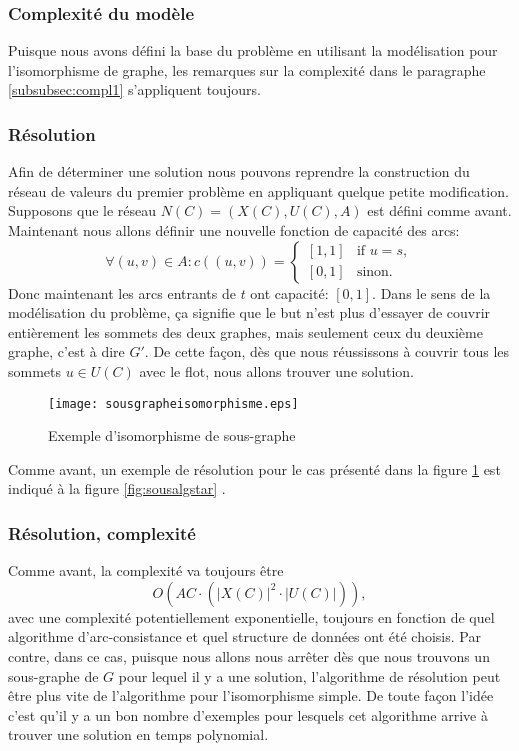 \documentclass[french]{article}
\theoremstyle{definition}
\theoremstyle{remark}
\begin{document}
\subsubsection{Complexité du modèle}
Puisque nous avons défini la base du problème en utilisant la modélisation pour l'isomorphisme de graphe, les remarques sur la complexité dans le paragraphe \ref{subsubsec:compl1} s'appliquent toujours.

\subsubsection{Résolution}
\label{sssec:res}
Afin de déterminer une solution nous pouvons reprendre la construction du réseau de valeurs du premier problème en appliquant quelque petite modification. Supposons que le réseau $N(C)=(X(C), U(C), A)$ est défini comme avant. Maintenant nous allons définir une nouvelle fonction de capacité des arcs:
\[  \forall (u,v) \in A:
c((u,v))= 
\begin{cases}
[1,1]& \text{if } u=s,\\
[0,1]              & \text{sinon}.
\end{cases}
\]
Donc maintenant les arcs entrants de $t$ ont capacité: $[0,1]$. Dans le sens de la modélisation du problème, ça signifie que le but n'est plus d'essayer de couvrir entièrement les sommets des deux graphes, mais seulement ceux du deuxième graphe, c'est à dire $G'$. De cette façon, dès que nous réussissons à couvrir tous les sommets $u \in U(C)$ avec le flot, nous allons trouver une solution. 
\begin{figure}[t]
	\centering
	\texttt{[image: sousgrapheisomorphisme.eps]}
	\caption{\label{fig:isosubgraph}Exemple d'isomorphisme de sous-graphe}
\end{figure}
Comme avant, un exemple de résolution pour le cas présenté dans la figure \ref{fig:isosubgraph} est indiqué à la figure \ref{fig:sousalgstar} .

\subsubsection{Résolution, complexité}
Comme avant, la complexité va toujours être 
 $$O(AC \cdot (|X(C)|^2 \cdot |U(C)|)),$$
avec une complexité potentiellement exponentielle, toujours en fonction de quel algorithme d'arc-consistance et quel structure de données ont été choisis. Par contre, dans ce cas, puisque nous allons nous arrêter dès que nous trouvons un sous-graphe de $G$ pour lequel il y a une solution, l'algorithme de résolution peut être plus vite de l'algorithme pour l'isomorphisme simple. De toute façon l'idée c'est qu'il y a un bon nombre d'exemples pour lesquels cet algorithme arrive à trouver une solution en temps polynomial.
\end{document}
